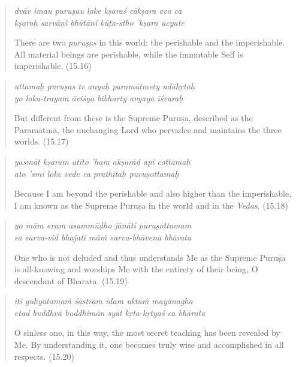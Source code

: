 \documentclass[12pt, twoside, openright]{memoir}
\begin{document}
\par
\begin{verse}
\textit{dvāv imau puruṣau loke kṣaraś cākṣara eva ca} \\
\textit{kṣaraḥ sarvāṇi bhūtāni kūṭa-stho ’kṣara ucyate}

\noindent There are two \textit{puruṣas} in this world: the perishable and the imperishable. All material beings are perishable, while the immutable Self is imperishable. (15.16)
\end{verse}
\par



\par
\begin{verse}
\textit{uttamaḥ puruṣas tv anyaḥ paramātmety udāhṛtaḥ} \\
\textit{yo loka-trayam āviśya bibharty avyaya īśvaraḥ}

\noindent But different from these is the Supreme Puruṣa, described as the Paramātmā, the unchanging Lord who pervades and maintains the three worlds. (15.17)
\end{verse}
\par



\par
\begin{verse}
\textit{yasmāt kṣaram atīto ’ham akṣarād api cottamaḥ} \\
\textit{ato ’smi loke vede ca prathitaḥ puruṣottamaḥ}

\noindent Because I am beyond the perishable and also higher than the imperishable, I am known as the Supreme Puruṣa in the world and in the \textit{Vedas}. (15.18)
\end{verse}
\par



\par
\begin{verse}
\textit{yo mām evam asammūḍho jānāti puruṣottamam} \\
\textit{sa sarva-vid bhajati māṁ sarva-bhāvena bhārata}

\noindent One who is not deluded and thus understands Me as the Supreme Puruṣa is all-knowing and worships Me with the entirety of their being, O descendant of Bharata. (15.19)
\end{verse}
\par



\par
\begin{verse}
\textit{iti guhyatamaṁ śāstram idam uktaṁ mayānagha} \\
\textit{etad buddhvā buddhimān syāt kṛta-kṛtyaś ca bhārata}

\noindent O sinless one, in this way, the most secret teaching has been revealed by Me. By understanding it, one becomes truly wise and accomplished in all respects. (15.20)
\end{verse}
\par
\end{document}
